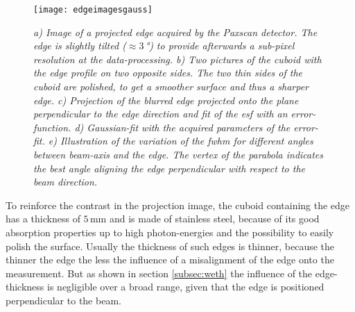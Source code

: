 \begin{figure}%
	\begin{center}
		\texttt{[image: edgeimagesgauss]}
	\end{center}
	\caption[Pictures of the knife edge and corresponding projection image]{\textit{a) Image of a projected edge acquired by the Paxscan detector. The edge is slightly tilted ($\approx 3\,$°) to provide afterwards a sub-pixel resolution at the data-processing.  b) Two pictures of the cuboid with the edge profile on two opposite sides. The two thin sides of the cuboid are polished, to get a smoother surface and thus a sharper edge. c) Projection of the blurred edge projected onto the plane perpendicular to the edge direction and fit of the \gls{esf} with an error-function. d) Gaussian-fit with the acquired parameters of the error-fit. e) Illustration of the variation of the \gls{fwhm} for different angles between beam-axis and the edge. The vertex of the parabola indicates the best angle aligning the edge perpendicular with respect to the beam direction.}}
	\label{edgeimages}
\end{figure}
\clearpage 
To reinforce the contrast in the projection image, the cuboid containing the edge has a thickness of $5\,$mm and is made of stainless steel, because of its good absorption properties up to high photon-energies and the possibility to easily polish the surface. Usually the thickness of such edges is thinner, because the thinner the edge the less the influence of a misalignment of the edge onto the measurement. But as shown in section \ref{subsec:weth} the influence of the edge-thickness is negligible over a broad range, given that the edge is positioned perpendicular to the beam.
